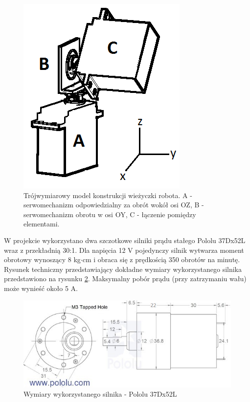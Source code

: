   \begin{figure}[H]
    \begin{center}
      \includegraphics[scale=0.45]{imgs/wieza_3d.png}
 	\caption[Model wieżyczki.]{\small{Trójwymiarowy model konstrukcji wieżyczki robota. A - serwomechanizm odpowiedzialny za obrót wokół osi OZ, B - serwomechanizm obrotu w osi OY, C - łączenie pomiędzy elementami.}}
	\label{wieza3d}
    \end{center}
  \end{figure}
W projekcie wykorzystano dwa szczotkowe silniki prądu stałego Pololu 37Dx52L wraz z przekładnią 30:1. Dla napięcia 12 V pojedynczy silnik wytwarza moment obrotowy wynoszący 8 kg$\cdot$cm i obraca się z prędkością 350 obrotów na minutę. Rysunek techniczny przedstawiający dokładne wymiary wykorzystanego silnika przedstawiono na rysunku \ref{wymiary_silnika}. Maksymalny pobór prądu (przy zatrzymaniu wału) może wynieść około 5 A.

  \begin{figure}[H]
    \begin{center}
      \includegraphics[scale=0.7]{imgs/silnik_wymiary.png}
 	\caption[Wymiary silnika Pololu 37Dx52L ]{\small{Wymiary wykorzystanego silnika - Pololu 37Dx52L }\footnotemark}
	\label{wymiary_silnika}
    \end{center}
  \end{figure}

